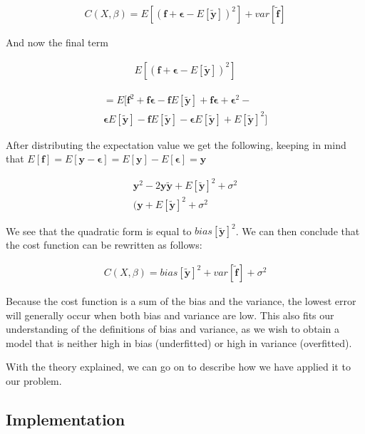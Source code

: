 \documentclass[twocolumn,10pt,cleanfoot]{asme2ej}
\begin{document}
\begin{gather}
C(X,\beta) = E\left[(\bm{f} + \bm{\epsilon} - E[\bm{\tilde{y}}])^2\right] + var[\bm{\tilde{f}}] 
\end{gather}

And now the final term

\begin{gather}
E\left[(\bm{f} + \bm{\epsilon} - E[\bm{\tilde{y}}])^2\right]
\end{gather}

\begin{multline}
= E[\bm{f}^2 + \bm{f}\bm{\epsilon} - \bm{f}E[\bm{\tilde{y}}] + \bm{f\epsilon} + \bm{\epsilon}^2 - \\ 
	\bm{\epsilon}E[\bm{\tilde{y}}] - \bm{f}E[\bm{\tilde{y}}] - \bm{\epsilon}E[\bm{\tilde{y}}] + E[\bm{\tilde{y}}]^2]
\end{multline}

After distributing the expectation value we get the following, keeping in mind that $E[\bm{f}] = E[\bm{y} - \bm{\epsilon}] = E[\bm{y}] - E[\bm{\epsilon}] = \bm{y}$

\begin{gather}
\bm{y}^2 - 2\bm{y}\bm{\tilde{y}} + E[\bm{\tilde{y}}]^2 + \sigma^2 \\
(\bm{y} + E[\bm{\tilde{y}}]^2 + \sigma^2 
\end{gather}

We see that the quadratic form is equal to $bias[\bm{\tilde{y}}]^2$. We can then conclude that the cost function can be rewritten as follows:

\begin{gather}
C(X,\beta) = bias[\bm{\tilde{y}}]^2 + var[\bm{\tilde{f}}] + \sigma^2 
\end{gather}


Because the cost function is a sum of the bias and the variance, the lowest error will generally occur when both bias and variance are low. This also fits our understanding of the definitions of bias and variance, as we wish to obtain a model that is neither high in bias (underfitted) or high in variance (overfitted).


With the theory explained, we can go on to describe how we have applied it to our problem.




\subsection{Implementation}
\end{document}
